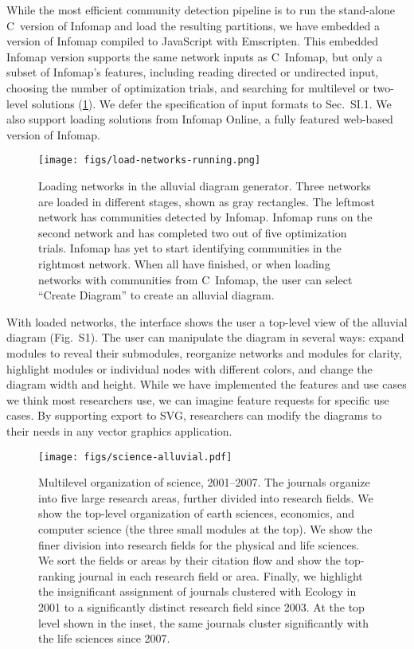 \documentclass[aps,rmp,floats,floatfix,twocolumn,superscriptaddress,final]{revtex4-2}
\newcommand{\CC}{C\nolinebreak\hspace{-.05em}\raisebox{.4ex}{\tiny\bf +}\nolinebreak\hspace{-.10em}\raisebox{.4ex}{\tiny\bf +}}
\begin{document}
While the most efficient community detection pipeline is to run the stand-alone \CC\ version of Infomap and load the resulting partitions, we have embedded a version of Infomap compiled to JavaScript with Emscripten.\cite{zakai2011emscripten}
This embedded Infomap version supports the same network inputs as \CC\ Infomap, but only a subset of Infomap's features, including reading directed or undirected input, choosing the number of optimization trials, and searching for multilevel or two-level solutions (\cref{fig:load-networks}).
We defer the specification of input formats to Sec.~SI.1.
We also support loading solutions from Infomap Online,\cite{mapequation2022infomaponline} a fully featured web-based version of Infomap.
%
\begin{figure}[htp!]
    \centering
    \texttt{[image: figs/load-networks-running.png]}
    \caption{Loading networks in the alluvial diagram generator. Three networks are loaded in different stages, shown as gray rectangles. The leftmost network has communities detected by Infomap. Infomap runs on the second network and has completed two out of five optimization trials. Infomap has yet to start identifying communities in the rightmost network. When all have finished, or when loading networks with communities from \CC\ Infomap, the user can select ``Create Diagram'' to create an alluvial diagram.}
    \label{fig:load-networks}
\end{figure}

With loaded networks, the interface shows the user a top-level view of the alluvial diagram (Fig.~S1). The user can manipulate the diagram in several ways: expand modules to reveal their submodules, reorganize networks and modules for clarity, highlight modules or individual nodes with different colors, and change the diagram width and height.
While we have implemented the features and use cases we think most researchers use, we can imagine feature requests for specific use cases.
By supporting export to SVG, researchers can modify the diagrams to their needs in any vector graphics application.

\begin{figure*}[htp!]
    \centering
    \texttt{[image: figs/science-alluvial.pdf]}
    \caption{Multilevel organization of science, 2001--2007. The journals organize into five large research areas, further divided into research fields. We show the top-level organization of earth sciences, economics, and computer science (the three small modules at the top). We show the finer division into research fields for the physical and life sciences. We sort the fields or areas by their citation flow and show the top-ranking journal in each research field or area.
    Finally, we highlight the insignificant assignment of journals clustered with Ecology in 2001 to a significantly distinct research field since 2003.
    At the top level shown in the inset, the same journals cluster significantly with the life sciences since 2007.}
    \label{fig:science-alluvial}
\end{figure*}
\end{document}
